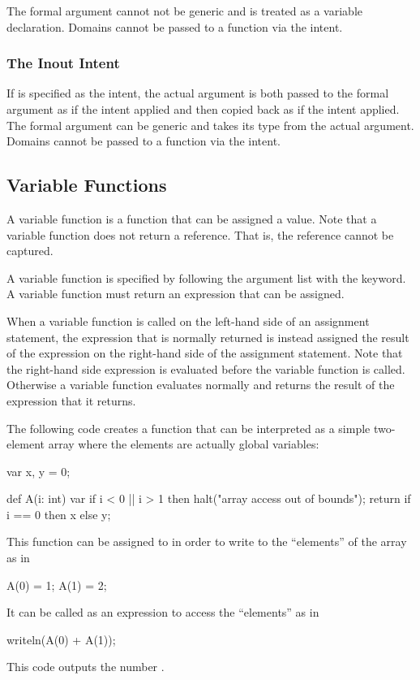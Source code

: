 The formal argument cannot not be generic and is treated as a variable
declaration.  Domains cannot be passed to a function via
the  intent.

\subsubsection{The Inout Intent}
\label{The_Inout_Intent}

If  is specified as the intent, the actual argument is
both passed to the formal argument as if the  intent applied
and then copied back as if the  intent applied.  The formal
argument can be generic and takes its type from the actual argument.
Domains cannot be passed to a function via the  intent.

\subsection{Variable Functions}
\label{Variable_Functions}

A variable function is a function that can be assigned a value.  Note
that a variable function does not return a reference.  That is, the
reference cannot be captured.

A variable function is specified by following the argument list with
the  keyword.  A variable function must return an expression
that can be assigned.

When a variable function is called on the left-hand side of an
assignment statement, the expression that is normally returned is
instead assigned the result of the expression on the right-hand side
of the assignment statement.  Note that the right-hand side expression
is evaluated before the variable function is called.  Otherwise a
variable function evaluates normally and returns the result of the
expression that it returns.

\begin{example}
The following code creates a function that can be interpreted as a
simple two-element array where the elements are actually global
variables:
\begin{chapel}
var x, y = 0;

def A(i: int) var {
  if i < 0 || i > 1 then
    halt("array access out of bounds");
  return if i == 0 then x else y;
}
\end{chapel}
This function can be assigned to in order to write to the ``elements''
of the array as in
\begin{chapel}
A(0) = 1;
A(1) = 2;
\end{chapel}
It can be called as an expression to access the ``elements'' as in
\begin{chapel}
writeln(A(0) + A(1));
\end{chapel}
This code outputs the number .
\end{example}

